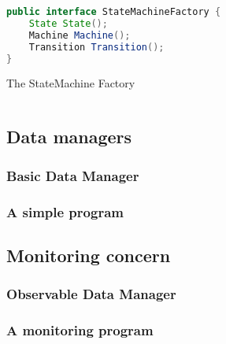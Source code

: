 \begin{sourcecode}[H]
	\begin{lstlisting}[language=Java]
public interface StateMachineFactory {
    State State();
    Machine Machine();
    Transition Transition();
}
	\end{lstlisting}
	\caption{The StateMachine Factory}
	\label{lst:StateMachineFactory}
\end{sourcecode}

\subsection{Data managers}

\subsubsection{Basic Data Manager}

\subsubsection{A simple program}

\subsection{Monitoring concern}

\subsubsection{Observable Data Manager}

\subsubsection{A monitoring program}




